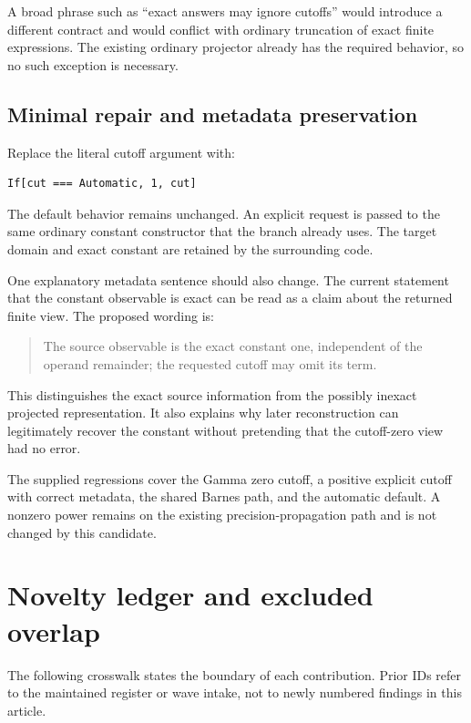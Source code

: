\documentclass[11pt,letterpaper]{article}
\newcommand{\code}[1]{\texttt{\detokenize{#1}}}
\begin{document}
A broad phrase such as ``exact answers may ignore cutoffs'' would introduce a different contract and would conflict with ordinary truncation of exact finite expressions. The existing ordinary projector already has the required behavior, so no such exception is necessary.\cite{core,operations}

\subsection{Minimal repair and metadata preservation}

Replace the literal cutoff argument with:
\begin{lstlisting}
If[cut === Automatic, 1, cut]
\end{lstlisting}
The default behavior remains unchanged. An explicit request is passed to the same ordinary constant constructor that the branch already uses. The target domain and exact constant \code{Function} are retained by the surrounding code.

One explanatory metadata sentence should also change. The current statement that the constant observable is exact can be read as a claim about the returned finite view. The proposed wording is:
\begin{quote}
The source observable is the exact constant one, independent of the operand remainder; the requested cutoff may omit its term.
\end{quote}
This distinguishes the exact source information from the possibly inexact projected representation. It also explains why later reconstruction can legitimately recover the constant without pretending that the cutoff-zero view had no error.

The supplied regressions cover the Gamma zero cutoff, a positive explicit cutoff with correct metadata, the shared Barnes path, and the automatic default. A nonzero power remains on the existing precision-propagation path and is not changed by this candidate.

\section{Novelty ledger and excluded overlap}\label{sec:novelty}

The following crosswalk states the boundary of each contribution. Prior IDs refer to the maintained register or wave intake, not to newly numbered findings in this article.\cite{register,wave3,wave4}
\end{document}
